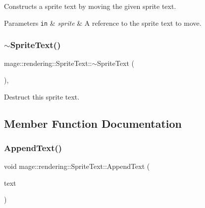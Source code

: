 Constructs a sprite text by moving the given sprite text.


\begin{DoxyParams}[1]{Parameters}
\mbox{\tt in}  & {\em sprite} & A reference to the sprite text to move. \\
\hline
\end{DoxyParams}
\mbox{\label{classmage_1_1rendering_1_1_sprite_text_a6ce8013356e64827767178e01cc2737c}} 
\subsubsection{\texorpdfstring{$\sim$\+Sprite\+Text()}{~SpriteText()}}
{\footnotesize\ttfamily mage\+::rendering\+::\+Sprite\+Text\+::$\sim$\+Sprite\+Text (\begin{DoxyParamCaption}{ }\end{DoxyParamCaption})\hspace{0.3cm}{\ttfamily [virtual]}, {\ttfamily [default]}}

Destruct this sprite text. 

\subsection{Member Function Documentation}
\mbox{\label{classmage_1_1rendering_1_1_sprite_text_a3b61f48d6001d8a7adf44d946797399b}} 
\subsubsection{\texorpdfstring{Append\+Text()}{AppendText()}}
{\footnotesize\ttfamily void mage\+::rendering\+::\+Sprite\+Text\+::\+Append\+Text (\begin{DoxyParamCaption}\item[{\mbox{\hyperlink{classmage_1_1rendering_1_1_color_string}{Color\+String}}}]{text }\end{DoxyParamCaption})}

